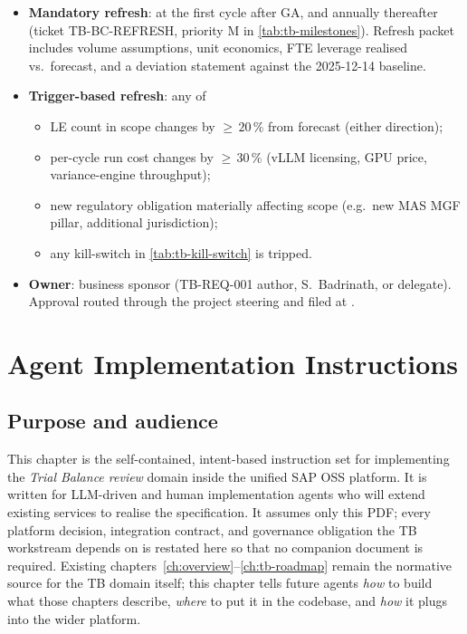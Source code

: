 \documentclass[11pt,a4paper,twoside]{report}
\begin{document}
\begin{itemize}
\item \textbf{Mandatory refresh}: at the first cycle after GA, and
annually thereafter (ticket TB-BC-REFRESH, priority M in
\cref{tab:tb-milestones}). Refresh packet includes volume
assumptions, unit economics,
FTE leverage realised vs.\ forecast, and a deviation statement
against the 2025-12-14 baseline.
\item \textbf{Trigger-based refresh}: any of
\begin{itemize}
\item LE count in scope changes by $\ge\,20$\,\% from forecast
(either direction);
\item per-cycle run cost changes by $\ge\,30$\,\% (vLLM
licensing, GPU price, variance-engine throughput);
\item new regulatory obligation materially affecting scope
(e.g.\ new MAS MGF pillar, additional jurisdiction);
\item any kill-switch in \cref{tab:tb-kill-switch} is tripped.
\end{itemize}
\item \textbf{Owner}: business sponsor (TB-REQ-001 author,
S.~Badrinath, or delegate). Approval routed through the
project steering and filed at
.
\end{itemize}
\chapter{Agent Implementation Instructions}\label{ch:agent-impl}

\section{Purpose and audience}
This chapter is the self-contained, intent-based instruction set for
implementing the \emph{Trial Balance review} domain inside the
unified SAP OSS platform. It is written for LLM-driven and human
implementation agents who will extend existing services to realise
the specification. It assumes only this PDF; every platform
decision, integration contract, and governance obligation the TB
workstream depends on is restated here so that no companion document
is required. Existing chapters~\ref{ch:overview}--\ref{ch:tb-roadmap}
remain the normative source for the TB domain itself; this chapter
tells future agents \emph{how} to build what those chapters
describe, \emph{where} to put it in the codebase, and \emph{how} it
plugs into the wider platform.
\end{document}
